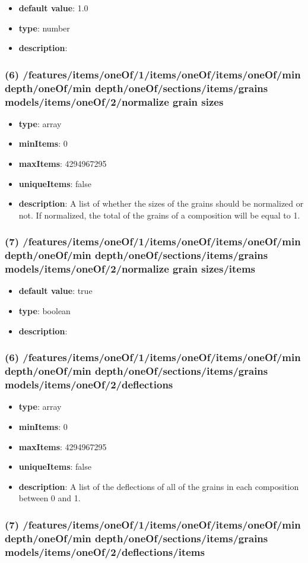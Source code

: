 \begin{itemize}[leftmargin=7em]\item {\bf default value}: 1.0
\item {\bf type}: number
\item {\bf description}: 
\end{itemize}\subsubsection{(6) /features/items/oneOf/1/items/oneOf/items/oneOf/min depth/oneOf/min depth/oneOf/sections/items/grains models/items/oneOf/2/normalize grain sizes}
\begin{itemize}[leftmargin=6em]\item {\bf type}: array
\item {\bf minItems}: 0
\item {\bf maxItems}: 4294967295
\item {\bf uniqueItems}: false
\item {\bf description}: A list of whether the sizes of the grains should be normalized or not. If normalized, the total of the grains of a composition will be equal to 1.
\end{itemize}\subsubsection{(7) /features/items/oneOf/1/items/oneOf/items/oneOf/min depth/oneOf/min depth/oneOf/sections/items/grains models/items/oneOf/2/normalize grain sizes/items}
\begin{itemize}[leftmargin=7em]\item {\bf default value}: true
\item {\bf type}: boolean
\item {\bf description}: 
\end{itemize}\subsubsection{(6) /features/items/oneOf/1/items/oneOf/items/oneOf/min depth/oneOf/min depth/oneOf/sections/items/grains models/items/oneOf/2/deflections}
\begin{itemize}[leftmargin=6em]\item {\bf type}: array
\item {\bf minItems}: 0
\item {\bf maxItems}: 4294967295
\item {\bf uniqueItems}: false
\item {\bf description}: A list of the deflections of all of the grains in each composition between 0 and 1.
\end{itemize}\subsubsection{(7) /features/items/oneOf/1/items/oneOf/items/oneOf/min depth/oneOf/min depth/oneOf/sections/items/grains models/items/oneOf/2/deflections/items}
